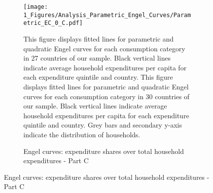 \begin{figure}[ht!]\ContinuedFloat
   \begin{subfigure}[b]{\textwidth}
  \centering
    \caption{Engel curves: expenditure shares over total household expenditures - Part C} \label{fig:Engel_3}
  \texttt{[image: 1\_Figures/Analysis\_Parametric\_Engel\_Curves/Parametric\_EC\_0\_C.pdf]}
  \begin{subcaption2}
    This figure displays fitted lines for parametric and quadratic Engel curves for each consumption category in 27 countries of our sample. Black vertical lines indicate average household expenditures per capita for each expenditure quintile and country. This figure displays fitted lines for parametric and quadratic Engel curves for each consumption category in 30 countries of our sample. Black vertical lines indicate average household expenditures per capita for each expenditure quintile and country. Grey bars and secondary y-axis indicate the distribution of households.
  \end{subcaption2}
\end{subfigure}
\end{figure}


